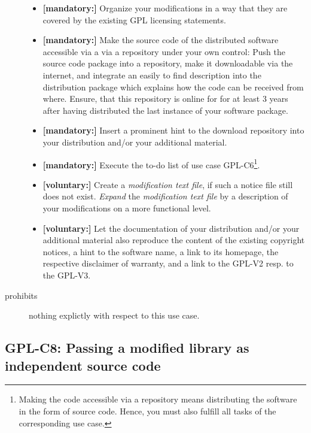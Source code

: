 \begin{description}
\begin{itemize}
  \item \textbf{[mandatory:]} Organize your modifications in a way that they are
  covered by the existing GPL licensing statements.
  
  \item \textbf{[mandatory:]} Make the source code of the distributed software
  accessible via a via a repository under your own control: Push the source code
  package into a repository, make it downloadable via the internet, and
  integrate an easily to find description into the distribution package which
  explains how the code can be received from where. Ensure, that this repository
  is online for for at least 3 years after having distributed the last instance
  of your software package.
  
  \item \textbf{[mandatory:]} Insert a prominent hint to the download repository
  into your distribution and/or your additional material.
  
  \item \textbf{[mandatory:]} Execute the to-do list of use case GPL-C6\footnote{
  Making the code accessible via a repository means distributing the software in
  the form of source code. Hence, you must also fulfill all tasks of the
  corresponding use case.}.

  
  \item \textbf{[voluntary:]} Create a \emph{modification text file}, if such a
  notice file still does not exist. \emph{Expand} the \emph{modification text
  file} by a description of your modifications on a more functional level.
      
  \item \textbf{[voluntary:]} Let the documentation of your distribution and/or
  your additional material also reproduce the content of the existing copyright
  notices, a hint to the software name, a link to its homepage, the respective
  disclaimer of warranty, and a link to the GPL-V2 resp. to the GPL-V3.


\end{itemize}

\item[prohibits] nothing explictly with respect to this use case.

\end{description}

\subsection{GPL-C8: Passing a modified library as independent source code}
\label{OSUC-08S-GPL}

